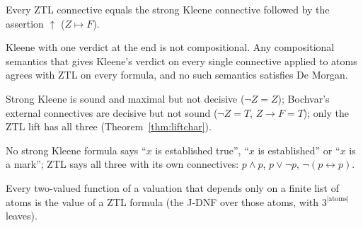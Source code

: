 \begin{theorem}\label{thm:upkleene}
  \leanok
  Every ZTL connective equals the strong Kleene connective followed by the
  assertion $\uparrow$ ($Z\mapsto F$).
\end{theorem}

\begin{theorem}\label{thm:uniquecomp}
  \leanok
  Kleene with one verdict at the end is not compositional. Any compositional
  semantics that gives Kleene's verdict on every single connective applied to
  atoms agrees with ZTL on every formula, and no such semantics satisfies De
  Morgan.
\end{theorem}

\begin{theorem}\label{thm:registers}
  \leanok
  Strong Kleene is sound and maximal but not decisive ($\neg Z=Z$); Bochvar's
  external connectives are decisive but not sound ($\neg Z=T$, $Z\to F=T$);
  only the ZTL lift has all three (Theorem~\ref{thm:liftchar}).
\end{theorem}

\begin{theorem}\label{thm:kleenemute}
  \leanok
  No strong Kleene formula says ``$x$ is established true'', ``$x$ is
  established'' or ``$x$ is a mark''; ZTL says all three with its own
  connectives: $p\wedge p$, $p\vee\neg p$, $\neg(p\leftrightarrow p)$.
\end{theorem}

\begin{theorem}\label{thm:expcomplete}
  \leanok
  Every two-valued function of a valuation that depends only on a finite list
  of atoms is the value of a ZTL formula (the J-DNF over those atoms, with
  $3^{|\mathrm{atoms}|}$ leaves).
\end{theorem}

